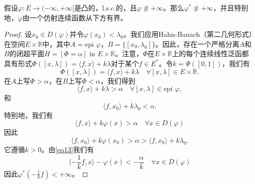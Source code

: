 \begin{proposition}\label{proposition1.10}
假设$\varphi: E \to (-\infty, +\infty]$是凸的，l.s.c.的，且$\varphi \not\equiv +\infty$。那么$\varphi^* \not\equiv +\infty$，并且特别地，$\varphi$由一个仿射连续函数从下方有界。
\end{proposition}
\begin{proof}
设$x_0 \in D(\varphi)$并令$\varphi(x_0) < \lambda_0$。我们应用Hahn-Banach（第二几何形式）在空间$E \times \mathbb{R}$中，其中$A = \text{epi } \varphi$，$B = \{[x_0, \lambda_0]\}$。因此，存在一个严格分离$A$和$B$的闭超平面$H=[\Phi=\alpha]$ in $E \times \mathbb{R}$。注意，$\Phi$在$E \times \mathbb{R}$上的每个连续线性泛函都具有形式$\Phi([x, \lambda]) = \langle f, x \rangle + k\lambda$对于某个$f \in E^*$。令$k=\Phi([0,1])$，我们有
\[ \Phi([x, \lambda]) = \langle f, x \rangle + k\lambda \quad \forall [x, \lambda] \in E \times \mathbb{R}. \]
在$A$上写$\Phi > \alpha$，在$B$上写$\Phi < \alpha$，我们得到
\[ \langle f, x \rangle + k\lambda > \alpha \quad \forall [x, \lambda] \in \text{epi } \varphi, \]
和
\[ \langle f, x_0 \rangle + k\lambda_0 < \alpha. \]
特别地，我们有
\begin{equation}\label{eq13}
\langle f, x \rangle + k\varphi(x) > \alpha \quad \forall x \in D(\varphi)
\end{equation}
因此
\[ \langle f, x_0 \rangle + k\varphi(x_0) > \alpha > \langle f, x_0 \rangle + k\lambda_0. \]
它遵循$k>0$。由\eqref{eq13}我们有
\[ \langle -\frac{1}{k}f, x \rangle - \varphi(x) < -\frac{\alpha}{k} \quad \forall x \in D(\varphi) \]
因此$\varphi^*(-\frac{1}{k}f) < +\infty$。
\end{proof}

